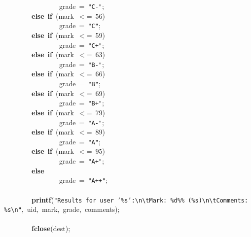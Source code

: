 \mbox{}\ \ \ \ \ \ \ \ \ \ \ \ \ \ \ \ grade\ =\ \texttt{"{}C-"{}}; \\
\mbox{}\ \ \ \ \ \ \ \ \textbf{else}\ \textbf{if}\ (mark\ $<$=\ 56) \\
\mbox{}\ \ \ \ \ \ \ \ \ \ \ \ \ \ \ \ grade\ =\ \texttt{"{}C"{}}; \\
\mbox{}\ \ \ \ \ \ \ \ \textbf{else}\ \textbf{if}\ (mark\ $<$=\ 59) \\
\mbox{}\ \ \ \ \ \ \ \ \ \ \ \ \ \ \ \ grade\ =\ \texttt{"{}C+"{}}; \\
\mbox{}\ \ \ \ \ \ \ \ \textbf{else}\ \textbf{if}\ (mark\ $<$=\ 63) \\
\mbox{}\ \ \ \ \ \ \ \ \ \ \ \ \ \ \ \ grade\ =\ \texttt{"{}B-"{}}; \\
\mbox{}\ \ \ \ \ \ \ \ \textbf{else}\ \textbf{if}\ (mark\ $<$=\ 66) \\
\mbox{}\ \ \ \ \ \ \ \ \ \ \ \ \ \ \ \ grade\ =\ \texttt{"{}B"{}}; \\
\mbox{}\ \ \ \ \ \ \ \ \textbf{else}\ \textbf{if}\ (mark\ $<$=\ 69) \\
\mbox{}\ \ \ \ \ \ \ \ \ \ \ \ \ \ \ \ grade\ =\ \texttt{"{}B+"{}}; \\
\mbox{}\ \ \ \ \ \ \ \ \textbf{else}\ \textbf{if}\ (mark\ $<$=\ 79) \\
\mbox{}\ \ \ \ \ \ \ \ \ \ \ \ \ \ \ \ grade\ =\ \texttt{"{}A-"{}}; \\
\mbox{}\ \ \ \ \ \ \ \ \textbf{else}\ \textbf{if}\ (mark\ $<$=\ 89) \\
\mbox{}\ \ \ \ \ \ \ \ \ \ \ \ \ \ \ \ grade\ =\ \texttt{"{}A"{}}; \\
\mbox{}\ \ \ \ \ \ \ \ \textbf{else}\ \textbf{if}\ (mark\ $<$=\ 95) \\
\mbox{}\ \ \ \ \ \ \ \ \ \ \ \ \ \ \ \ grade\ =\ \texttt{"{}A+"{}}; \\
\mbox{}\ \ \ \ \ \ \ \ \textbf{else} \\
\mbox{}\ \ \ \ \ \ \ \ \ \ \ \ \ \ \ \ grade\ =\ \texttt{"{}A++"{}}; \\
\mbox{} \\
\mbox{}\ \ \ \ \ \ \ \ \textbf{printf}(\texttt{"{}Results\ for\ user\ '\%s':}\texttt{\textbackslash{}n\textbackslash{}t}\texttt{Mark:\ \%d\%\%\ (\%s)}\texttt{\textbackslash{}n\textbackslash{}t}\texttt{Comments:\ \%s}\texttt{\textbackslash{}n}\texttt{"{}},\ uid,\ mark,\ grade,\ comments); \\
\mbox{}\ \ \ \ \ \ \ \  \\
\mbox{}\ \ \ \ \ \ \ \ \textbf{fclose}(dest); \\
